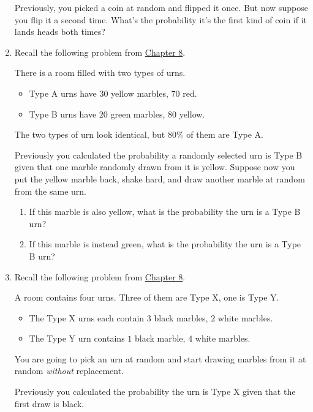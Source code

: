 \documentclass[justified]{tufte-book}
\providecommand{\tightlist}{%
  \setlength{\itemsep}{0pt}\setlength{\parskip}{0pt}}
\theoremstyle{definition}
\theoremstyle{definition}
\theoremstyle{definition}
\theoremstyle{definition}
\theoremstyle{remark}
\begin{document}
\begin{enumerate}
  Previously, you picked a coin at random and flipped it once. But now suppose you flip it a second time. What's the probability it's the first kind of coin if it lands heads both times?
\item
  Recall the following problem from \protect\hyperlink{bayes-theorem}{Chapter 8}.

  There is a room filled with two types of urns.

  \begin{itemize}
  \tightlist
  \item
    Type A urns have \(30\) yellow marbles, \(70\) red.
  \item
    Type B urns have \(20\) green marbles, \(80\) yellow.
  \end{itemize}

  The two types of urn look identical, but \(80\%\) of them are Type A.

  Previously you calculated the probability a randomly selected urn is Type B given that one marble randomly drawn from it is yellow. Suppose now you put the yellow marble back, shake hard, and draw another marble at random from the same urn.

  \begin{enumerate}
  \def\labelenumii{\alph{enumii}.}
  \tightlist
  \item
    If this marble is also yellow, what is the probability the
    urn is a Type B urn?
  \item
    If this marble is instead green, what is the probability the urn
    is a Type B urn?
  \end{enumerate}
\item
  Recall the following problem from \protect\hyperlink{bayes-theorem}{Chapter 8}.

  A room contains four urns. Three of them are Type X, one is Type Y.

  \begin{itemize}
  \tightlist
  \item
    The Type X urns each contain \(3\) black marbles, \(2\) white marbles.
  \item
    The Type Y urn contains \(1\) black marble, \(4\) white marbles.
  \end{itemize}

  You are going to pick an urn at random and start drawing marbles from it at random \emph{without} replacement.

  Previously you calculated the probability the urn is Type X given that the first draw is black.


\end{enumerate}
\end{document}
